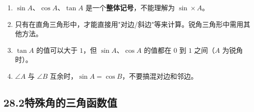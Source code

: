\documentclass[12pt, a4paper]{ctexart}
\begin{document}
\begin{warnbox}[易错提醒]
\begin{enumerate}[nosep]
  \item $\sin A$、$\cos A$、$\tan A$ 是一个\textbf{整体记号}，不能理解为 $\sin\times A$。
  \item 只有在直角三角形中，才能直接用"对边/斜边"等来计算。锐角三角形中需用其他方法。
  \item $\tan A$ 的值可以大于 $1$，但 $\sin A$、$\cos A$ 的值都在 $0$ 到 $1$ 之间（$A$ 为锐角时）。
  \item $\angle A$ 与 $\angle B$ 互余时，$\sin A=\cos B$，不要搞混对边和邻边。
\end{enumerate}
\end{warnbox}

\subsection*{28.2\quad 特殊角的三角函数值}
\end{document}
